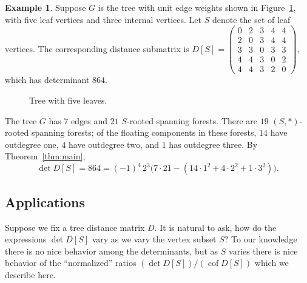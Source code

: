 \documentclass{amsart}
\theoremstyle{definition}
\newtheorem{eg}[thm]{Example}
\DeclareMathOperator{\cof}{cof}
\begin{document}
\begin{eg}
Suppose $G$ is the tree with unit edge weights shown in Figure~\ref{fig:tree-5}, with five leaf vertices and three internal vertices.
Let $S$ denote the set of leaf vertices. 
The corresponding distance submatrix is
$
	D[S] = \begin{pmatrix}
	0 & 2 & 3 & 4 & 4 \\
	2 & 0 & 3 & 4 & 4 \\
	3 & 3 & 0 & 3 & 3 \\
	4 & 4 & 3 & 0 & 2 \\
	4 & 4 & 3 & 2 & 0
	\end{pmatrix},
$
which has determinant $864$.

\begin{figure}[h]
\centering
{}
\caption{Tree with five leaves.}
\label{fig:tree-5}
\end{figure}

The tree $G$ has $7$ edges and $21$ $S$-rooted spanning forests.
There are $19$ $(S, *)$-rooted spanning forests;
of the floating components in these forests, $14$ have outdegree one, $4$ have outdegree two, and $1$ has outdegree three.
By Theorem~\ref{thm:main},
\[
	\det D[S] = 864
	= (-1)^4\, 2^3 \Big( 7 \cdot 21 - (14 \cdot 1^2 + 4 \cdot 2^2 + 1 \cdot 3^2) \Big).
\]
\end{eg}

\subsection{Applications}
Suppose we fix a tree distance matrix $D$.
It is natural to ask, how do the expressions $\det D[S]$ vary as we vary the vertex subset $S$? 
To our knowledge there is no nice behavior among the determinants, but  as $S$ varies there is nice behavior of the ``normalized'' ratios 
$(\det D[S]) / (\cof D[S])$
which we describe here.
\end{document}
